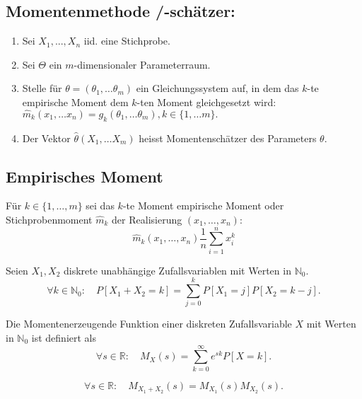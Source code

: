 \subsection{Momentenmethode /-schätzer:}
\begin{enumerate}
  \item Sei $X_1, ..., X_n$ iid. eine Stichprobe.
  \item Sei $\Theta$ ein $m$-dimensionaler Parameterraum.
  \item Stelle für $\theta = (\theta_1,\dots \theta_m)$ ein Gleichungssystem auf, in dem das $k$-te empirische Moment dem $k$-ten Moment gleichgesetzt wird: $\hat m_k(x_1,\dots x_n) = g_k(\theta_1,\dots \theta_m), k \in \{1,\dots m\}.$
  \item Der Vektor $\hat \theta(X_1,\dots X_m)$ heisst Momentenschätzer des Parameters $\theta.$
\end{enumerate}

\subsection{Empirisches Moment}
Für $k \in \{1, \dots, m\}$ sei das $k$-te Moment empirische Moment
oder Stichprobenmoment $\hat{m}_k$ der Realisierung $(x_1, \dots, x_n)$:
\begin{equation*}
  \hat{m}_k(x_1, \dots, x_n)  \frac{1}{n} \sum_{i=1}^{n}  x_i^k
\end{equation*}

Seien \(X_1, X_2\) diskrete unabhängige Zufallsvariablen mit Werten in \(\mathbb{N}_0\).
\[
  \forall k \in \mathbb{N}_0: \quad P[X_1 + X_2 = k] = \sum_{j=0}^{k} P[X_1 = j]P[X_2 = k - j].
\]

Die Momentenerzeugende Funktion einer diskreten Zufallsvariable \(X\) mit Werten in \(\mathbb{N}_0\) ist definiert als
\[
  \forall s \in \mathbb{R}: \quad M_X(s) = \sum_{k=0}^{\infty} e^{sk}P[X = k].
\]

\[
  \forall s \in \mathbb{R}: \quad M_{X_1+X_2}(s) = M_{X_1}(s)M_{X_2}(s).
\]